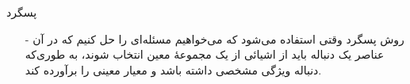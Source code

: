 \begin{frame}{‌پسگرد}
\begin{itemize}\itemr
\item[-]
روش پسگرد وقتی استفاده می‌شود که می‌خواهیم مسئله‌ای را حل کنیم که در آن عناصر یک دنباله
باید از اشیائی از یک مجموعهٔ
معین انتخاب شوند، به طوری‌که دنباله ویژگی مشخصی داشته باشد و معیار
معینی را برآورده کند.
\end{itemize}
\end{frame}